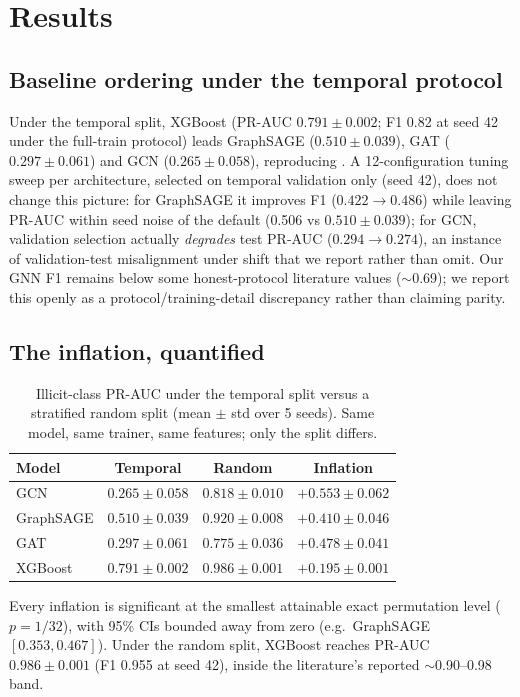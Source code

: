 \documentclass[11pt]{article}
\begin{document}
\section{Results}
\subsection{Baseline ordering under the temporal protocol}
Under the temporal split, XGBoost (PR-AUC $0.791\pm0.002$; F1 0.82 at seed 42
under the full-train protocol) leads GraphSAGE ($0.510\pm0.039$), GAT
($0.297\pm0.061$) and GCN ($0.265\pm0.058$), reproducing \citet{weber2019aml}. A
12-configuration tuning sweep per architecture, selected on temporal validation
only (seed 42), does not change this picture: for GraphSAGE it improves F1
($0.422 \rightarrow 0.486$) while leaving PR-AUC within seed noise of the default
(0.506 vs $0.510\pm0.039$); for GCN, validation selection actually \emph{degrades}
test PR-AUC ($0.294 \rightarrow 0.274$), an instance of validation-test
misalignment under shift that we report rather than omit. Our GNN F1 remains below
some honest-protocol literature values ($\sim$0.69); we report this openly as a
protocol/training-detail discrepancy rather than claiming parity.

\subsection{The inflation, quantified}
\begin{table}[h]
\centering
\caption{Illicit-class PR-AUC under the temporal split versus a stratified
random split (mean $\pm$ std over 5 seeds). Same model, same trainer, same
features; only the split differs.}
\label{tab:inflation}
\begin{tabular}{lccc}
\toprule
Model & Temporal & Random & Inflation \\
\midrule
GCN & $0.265\pm0.058$ & $0.818\pm0.010$ & $+0.553\pm0.062$ \\
GraphSAGE & $0.510\pm0.039$ & $0.920\pm0.008$ & $+0.410\pm0.046$ \\
GAT & $0.297\pm0.061$ & $0.775\pm0.036$ & $+0.478\pm0.041$ \\
XGBoost & $0.791\pm0.002$ & $0.986\pm0.001$ & $+0.195\pm0.001$ \\
\bottomrule
\end{tabular}
\end{table}

Every inflation is significant at the smallest attainable exact permutation level
($p=1/32$), with 95\% CIs bounded away from zero (e.g.\ GraphSAGE $[0.353,0.467]$).
Under the random split, XGBoost reaches PR-AUC $0.986\pm0.001$ (F1 0.955 at seed
42), inside the literature's reported $\sim$0.90--0.98 band.
\end{document}
